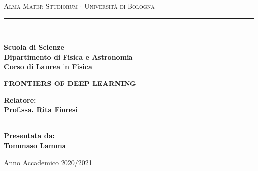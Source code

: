 \documentclass[../main.tex]{subfiles}
\begin{document}
\begin{titlepage}
   \begin{center}
        {{\Large{\textsc{Alma Mater Studiorum $\cdot$ Universit\`a di Bologna}}}} 
        \rule[0.1cm]{15.8cm}{0.1mm}
        \rule[0.5cm]{15.8cm}{0.6mm}
        \\\vspace{3mm}
        {\small{\bf Scuola di Scienze \\ 
        Dipartimento di Fisica e Astronomia\\
        Corso di Laurea in Fisica}}
    \end{center}
    \vspace{23mm}
    \begin{center}
        {{\LARGE{\bf FRONTIERS OF DEEP LEARNING}}\\}
    \end{center}
    \vspace{50mm} \par \noindent
    \begin{minipage}[t]{0.47\textwidth}
        {\large{\bf Relatore: \vspace{2mm}\\
        Prof.ssa. Rita Fioresi\\\\
        }}
    \end{minipage}
    \hfill
    \begin{minipage}[t]{0.47\textwidth}\raggedleft
        {\large{\bf Presentata da:
        \vspace{2mm}\\
        Tommaso Lamma}}
    \end{minipage}
    \vspace{40mm}
    \begin{center}
        Anno Accademico 2020/2021
    \end{center}
\end{titlepage}
\end{document}
